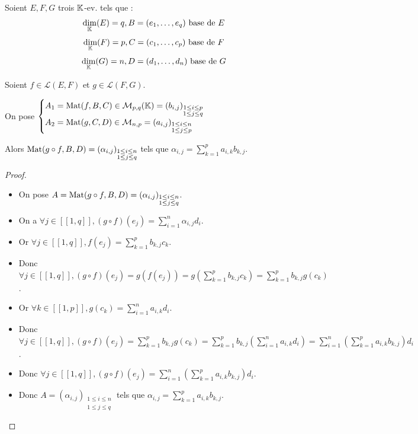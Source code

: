 \documentclass[12pt,a4paper]{report}
\begin{document}
\begin{property}
    Soient $E,F,G$ trois $\mathbb{K}$-ev. tels que :
    $$\underset{\mathbb{K}}\dim(E) = q, B = (e_1,\dots,e_q) \text{ base de } E$$
    $$\underset{\mathbb{K}}\dim(F) = p, C = (c_1,\dots,c_p) \text{ base de } F$$
    $$\underset{\mathbb{K}}\dim(G) = n, D = (d_1,\dots,d_n) \text{ base de } G$$

    Soient $f \in \mathcal L(E,F)$ et $g \in \mathcal L(F,G)$.

    On pose $\displaystyle\begin{cases} A_1 = \mathrm{Mat}(f,B,C) \in \mathcal M_{p,q}(\mathbb{K}) = (b_{i,j})_{\substack{1 \le i \le p \\ 1 \le j \le q}}\\
    A_2 = \mathrm{Mat}(g,C,D) \in \mathcal M_{n,p} = (a_{i,j})_{\substack{1 \le i \le n \\ 1 \le j \le p}}
    \end{cases}$

    Alors $\mathrm{Mat}(g \circ f, B, D) = (\alpha_{i,j})_{\substack{1 \le i \le n \\ 1 \le j \le q}}$ tels que $\alpha_{i,j} = \sum_{k=1}^p a_{i,k} b_{k,j}$.
\end{property}

\begin{proof}
\begin{itemize}
    \item On pose $A = \mathrm{Mat}(g \circ f, B, D) = (\alpha_{i,j})_{\substack{1 \le i \le n \\ 1 \le j \le q}}$.

    \item On a $\forall j \in [\![1,q]\!], (g \circ f)(e_j) = \sum_{i=1}^n \alpha_{i,j} d_i$.

    \item Or $\forall j \in [\![1,q]\!], f(e_j) = \sum_{k=1}^p b_{k,j} c_k$.

    \item Donc $\forall j \in [\![1,q]\!], (g \circ f)(e_j) = g(f(e_j)) = g\left(\sum_{k=1}^p b_{k,j} c_k\right) = \sum_{k=1}^p b_{k,j} g(c_k)$.

    \item Or $\forall k \in [\![1,p]\!], g(c_k) = \sum_{i=1}^n a_{i,k} d_i$.

    \item Donc $\forall j \in [\![1,q]\!], (g \circ f)(e_j) = \sum_{k=1}^p b_{k,j} g(c_k) = \sum_{k=1}^p b_{k,j} \left(\sum_{i=1}^n a_{i,k} d_i\right) = \sum_{i=1}^n \left(\sum_{k=1}^p a_{i,k} b_{k,j}\right) d_i$.

    \item Donc $\forall j \in [\![1,q]\!], (g \circ f)(e_j) = \sum_{i=1}^n \left(\sum_{k=1}^p a_{i,k} b_{k,j}\right) d_i$.

    \item Donc $A = (\alpha_{i,j})_{\substack{1 \le i \le n \\ 1 \le j \le q}}$ tels que $\alpha_{i,j} = \sum_{k=1}^p a_{i,k} b_{k,j}$.
\end{itemize}
\end{proof}
\end{document}
